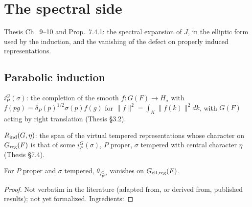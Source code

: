 \chapter{The spectral side}
\label{chap:spectral}
Thesis Ch.~9--10 and Prop.~7.4.1: the spectral expansion of $J$, in the elliptic form used by the induction,
and the vanishing of the defect on properly induced representations.

\section{Parabolic induction}
\begin{definition}
\label{parInd}
\leanok
{}
$i_P^G(\sigma)$: the completion of the smooth $f:G(F)\to H_\sigma$ with $f(pg)=\delta_P(p)^{1/2}\sigma(p)f(g)$ for
$\|f\|^2=\int_K\|f(k)\|^2dk$, with $G(F)$ acting by right translation (Thesis \S3.2).
\end{definition}

\begin{definition}
\label{Rind}
\leanok
{}
$R_{\mathrm{ind}}(G,\eta)$: the span of the virtual tempered representations whose character on $G_{\mathrm{reg}}(F)$ is that of some
$i_P^G(\sigma)$, $P$ proper, $\sigma$ tempered with central character $\eta$ (Thesis \S7.4).
\end{definition}

\begin{theorem}
\label{vanDijk_charG_parInd_ell}
\leanok
{}
For $P$ proper and $\sigma$ tempered, $\theta_{i_P^G\sigma}$ vanishes on $G_{\mathrm{ell,reg}}(F)$.
\end{theorem}
\begin{proof}
Not verbatim in the literature (adapted from, or derived from, published results); not yet formalized. Ingredients: 
\end{proof}

